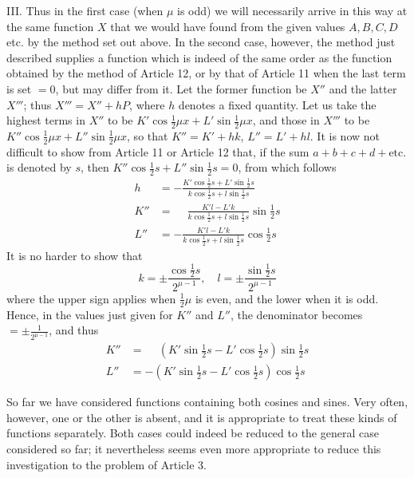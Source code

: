 III. Thus in the first case (when \(\mu\) is odd) we will necessarily arrive in this way at the same function \(X\) that we would have found from the given values \(A,B,C,D\) etc. by the method set out above. In the second case, however, the method just described supplies a function which is indeed of the same order as the function obtained by the method of Article 12, or by that of Article 11 when the last term is set
\(=0\), but may differ from it. Let the former function be \(X''\) and the latter \(X'''\); thus \(X'''=X''+hP\), where \(h\) denotes a fixed quantity. Let us take the highest terms in \(X''\) to be \(K'\cos\frac{1}{2}\mu x+L'\sin\frac{1}{2}\mu x\), and those in \(X'''\) to be \(K''\cos\frac{1}{2}\mu x+L''\sin\frac{1}{2}\mu x\), so that \(K''=K'+hk\), \(L''=L'+hl\). It is now not difficult to show from Article 11 or Article 12 that, if the sum \(a+b+c+d+\text{etc.}\) is denoted by \(s\), then \(K''\cos\frac{1}{2}s+L''\sin\frac{1}{2}s=0\), from which follows
\[
\begin{aligned}
h&=-\frac{K'\cos\frac{1}{2}s+L'\sin\frac{1}{2}s}
              {k\cos\frac{1}{2}s+l\sin\frac{1}{2}s}\\[5pt]
K''&=\phantom{-}\frac{K'l-L'k}
              {k\cos\frac{1}{2}s+l\sin\frac{1}{2}s}\sin\tfrac{1}{2}s\\[5pt]
L''&=-\frac{K'l-L'k}
              {k\cos\frac{1}{2}s+l\sin\frac{1}{2}s}\cos\tfrac{1}{2}s
\end{aligned}
\]
It is no harder to show that
\[
k=\pm\frac{\cos\frac{1}{2}s}{2^{\mu-1}},\quad
l=\pm\frac{\sin\frac{1}{2}s}{2^{\mu-1}}
\]
where the upper sign applies when \(\frac{1}{2}\mu\) is even, and the lower when it is odd. Hence, in the values just given for \(K''\) and \(L''\), the denominator becomes \(=\pm\frac{1}{2^{\mu-1}}\), and thus
\[
\begin{aligned}
K''&=\phantom{-}(K'\sin\tfrac{1}{2}s-L'\cos\tfrac{1}{2}s)\sin\tfrac{1}{2}s\\[5pt]
L''&=-(K'\sin\tfrac{1}{2}s-L'\cos\tfrac{1}{2}s)\cos\tfrac{1}{2}s
\end{aligned}
\]


So far we have considered functions containing both cosines and sines. Very often, however, one or the other is absent, and it is appropriate to treat these kinds of functions separately. Both cases could indeed be reduced to the general case considered so far; it nevertheless seems even more appropriate to reduce this investigation to the problem of Article 3.

